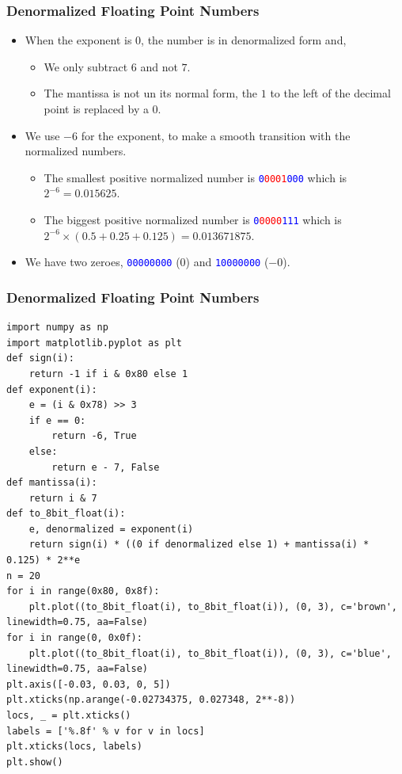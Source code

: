 \documentclass{beamer}
\begin{document}
\begin{frame}[fragile]
\frametitle{Denormalized Floating Point Numbers}

\begin{itemize}

\item When the exponent is $0$, the number is in denormalized form and,
\begin{itemize}
\item We only subtract $6$ and not $7$.
\item The mantissa is not un its normal form, the $1$ to the left of the decimal point
  is replaced by a $0$.
\end{itemize}

\vspace{0.3cm}

\item We use $-6$ for the exponent, to make a smooth transition with the normalized numbers.
  \begin{itemize}
  \item The smallest positive normalized number is \textcolor{blue}{\texttt{0\textcolor{red}{0001}000}} which is $2^{-6} = 0.015625$.
  \item The biggest positive normalized number is \textcolor{blue}{\texttt{0\textcolor{red}{0000}111}} which is $2^{-6} \times (0.5 + 0.25 + 0.125) = 0.013671875$.
  \end{itemize}

  \vspace{0.3cm}

\item We have two zeroes, \textcolor{blue}{\texttt{00000000}} ($0$) and \textcolor{blue}{\texttt{10000000}} ($-0$).

\end{itemize}

\end{frame}


\begin{frame}[fragile]
\frametitle{Denormalized Floating Point Numbers}
\tiny

\begin{lstlisting}[linebackgroundcolor={\lstcolorlines{5,6,7,8,9,10,13,14,15}}]
import numpy as np
import matplotlib.pyplot as plt
def sign(i):
    return -1 if i & 0x80 else 1
def exponent(i):
    e = (i & 0x78) >> 3
    if e == 0:
        return -6, True
    else:
        return e - 7, False
def mantissa(i):
    return i & 7
def to_8bit_float(i):
    e, denormalized = exponent(i)
    return sign(i) * ((0 if denormalized else 1) + mantissa(i) * 0.125) * 2**e
n = 20
for i in range(0x80, 0x8f):
    plt.plot((to_8bit_float(i), to_8bit_float(i)), (0, 3), c='brown', linewidth=0.75, aa=False)
for i in range(0, 0x0f):
    plt.plot((to_8bit_float(i), to_8bit_float(i)), (0, 3), c='blue', linewidth=0.75, aa=False)
plt.axis([-0.03, 0.03, 0, 5])
plt.xticks(np.arange(-0.02734375, 0.027348, 2**-8))
locs, _ = plt.xticks()
labels = ['%.8f' % v for v in locs]
plt.xticks(locs, labels)
plt.show()
\end{lstlisting}

\end{frame}
\end{document}
